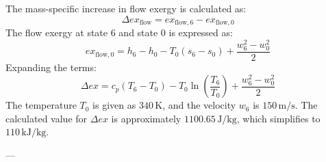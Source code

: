 The mass-specific increase in flow exergy is calculated as:  
\[
\Delta ex_{\text{flow}} = ex_{\text{flow},6} - ex_{\text{flow},0}
\]  
The flow exergy at state 6 and state 0 is expressed as:  
\[
ex_{\text{flow},0} = h_6 - h_0 - T_0(s_6 - s_0) + \frac{w_6^2 - w_0^2}{2}
\]  
Expanding the terms:  
\[
\Delta ex = c_p(T_6 - T_0) - T_0 \ln \left( \frac{T_6}{T_0} \right) + \frac{w_6^2 - w_0^2}{2}
\]  
The temperature \( T_0 \) is given as \( 340 \, \text{K} \), and the velocity \( w_6 \) is \( 150 \, \text{m/s} \).  
The calculated value for \( \Delta ex \) is approximately \( 1100.65 \, \text{J/kg} \), which simplifies to \( 110 \, \text{kJ/kg} \).  

---